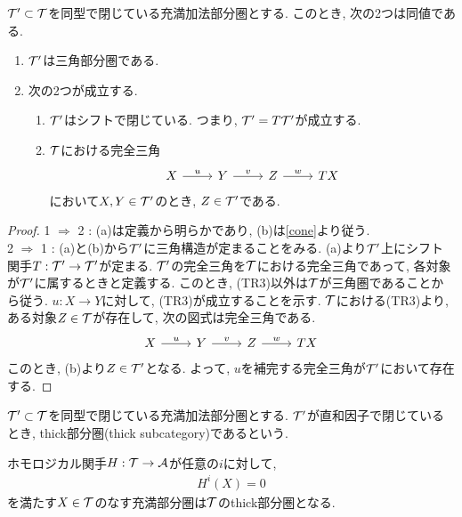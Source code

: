 \documentclass[uplatex, a4paper, 14Q, dvipdfmx]{jsarticle}
\begin{document}
\begin{theorem} \label{sub_triangle}
  $\mathcal{T}' \subset \mathcal{T}$を同型で閉じている充満加法部分圏とする. 
  このとき, 次の2つは同値である. 
  \begin{enumerate}
    \item $\mathcal{T}'$は三角部分圏である.
    \item 次の2つが成立する. 
    \begin{enumerate}
      \item $\mathcal{T}'$はシフトで閉じている. 
      つまり, $\mathcal{T}' = T\mathcal{T}'$が成立する. 
      \item $\mathcal{T}$における完全三角
      \[\begin{tikzcd}
        X & Y & Z & TX
        \arrow["u", from=1-1, to=1-2]
        \arrow["v", from=1-2, to=1-3]
        \arrow["w", from=1-3, to=1-4]
      \end{tikzcd}\]
      において$X, Y \in \mathcal{T}'$のとき, $Z \in \mathcal{T}'$である. 
    \end{enumerate}
  \end{enumerate}
\end{theorem}

\begin{proof}
  1 $\Rightarrow$ 2 : (a)は定義から明らかであり, (b)は\cref{cone}より従う. \\
  2 $\Rightarrow$ 1 : (a)と(b)から$\mathcal{T}'$に三角構造が定まることをみる. 
  (a)より$\mathcal{T}'$上にシフト関手$T: \mathcal{T}' \to \mathcal{T}'$が定まる. 
  $\mathcal{T}'$の完全三角を$\mathcal{T}$における完全三角であって, 各対象が$\mathcal{T}'$に属するときと定義する. 
  このとき, (TR3)以外は$\mathcal{T}$が三角圏であることから従う. 
  $u: X \to Y$に対して, (TR3)が成立することを示す. 
  $\mathcal{T}$における(TR3)より, ある対象$Z \in \mathcal{T}$が存在して, 次の図式は完全三角である. 
  \[\begin{tikzcd}
    X & Y & Z & TX
    \arrow["u", from=1-1, to=1-2]
    \arrow["v", from=1-2, to=1-3]
    \arrow["w", from=1-3, to=1-4]
  \end{tikzcd}\]
  このとき, (b)より$Z \in \mathcal{T}'$となる. 
  よって, $u$を補完する完全三角が$\mathcal{T}'$において存在する. 
\end{proof}

\begin{definition}[thick部分圏]
  $\mathcal{T}' \subset \mathcal{T}$を同型で閉じている充満加法部分圏とする. 
  $\mathcal{T}'$が直和因子で閉じているとき, thick部分圏(thick subcategory)であるという. 
\end{definition}

\begin{theorem}
  ホモロジカル関手$H: \mathcal{T} \to \mathcal{A}$が任意の$i$に対して, 
  \begin{align*}
    H^i(X) = 0
  \end{align*}
  を満たす$X \in \mathcal{T}$のなす充満部分圏は$\mathcal{T}$のthick部分圏となる. 
\end{theorem}
\end{document}
